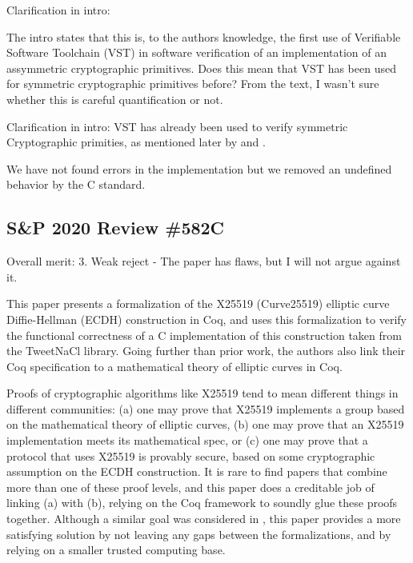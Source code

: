 Clarification in intro:

The intro states that this is, to the authors knowledge, the first use of
Verifiable Software Toolchain (VST) in software verification of an implementation
of an assymmetric cryptographic primitives. Does this mean that VST has been
used for symmetric cryptographic primitives before? From the text, I wasn't sure
whether this is careful quantification or not.


Clarification in intro: VST has already been used to verify symmetric Cryptographic
primities, as mentioned later by \cite{Beringer2015VerifiedCA} and \cite{2015-Appel}.

We have not found errors in the implementation but we removed an undefined
behavior by the C standard.



\subsection{S\&P 2020 Review \#582C}

Overall merit: 3. Weak reject - The paper has flaws, but I will not argue against it.


\begin{center}
\end{center}

This paper presents a formalization of the X25519 (Curve25519) elliptic curve
Diffie-Hellman  (ECDH) construction in Coq, and uses this formalization to
verify the functional correctness of a C implementation of this construction
taken from the TweetNaCl library. Going further than prior work, the authors
also link their Coq specification to a mathematical theory of elliptic curves
in Coq.


\begin{center}
\end{center}

Proofs of cryptographic algorithms like X25519 tend to mean different things in
different communities: (a) one may prove that X25519 implements a group based on
the mathematical theory of elliptic curves, (b) one may prove that an X25519
implementation meets its mathematical spec, or (c) one may prove that a protocol
that uses X25519 is provably secure, based on some cryptographic assumption on
the ECDH construction. It is rare to find papers that combine more than one of
these proof levels, and this paper does a creditable job of linking (a) with (b),
relying on the Coq framework to soundly glue these proofs together. Although a
similar goal was considered in \cite{Zinzindohoue2016AVE}, this paper provides
a more satisfying solution by not leaving any gaps between the formalizations,
and by relying on a smaller trusted computing base.


